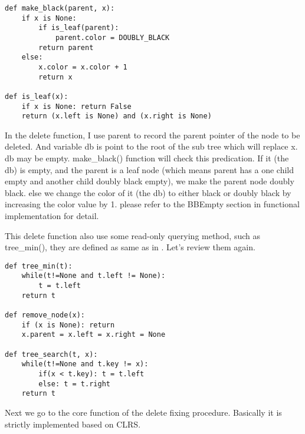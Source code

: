 \documentclass{article}
\begin{document}
\begin{lstlisting}
def make_black(parent, x):
    if x is None:
        if is_leaf(parent):
            parent.color = DOUBLY_BLACK
        return parent
    else:
        x.color = x.color + 1
        return x

def is_leaf(x):
    if x is None: return False
    return (x.left is None) and (x.right is None)
\end{lstlisting}

In the delete function, I use parent to record the parent pointer of the node to be deleted. 
And variable db is point to the root of the sub tree which will replace x. db may be empty.
make\_black() function will check this predication. If it (the db) is empty, and the parent is a leaf
node (which means parent has a one child empty and another child doubly black empty), we make
the parent node doubly black. else we change the color of it (the db) to either black or doubly
black by increasing the color value by 1. please refer to the BBEmpty section in functional 
implementation for detail.

This delete function also use some read-only querying method, such as tree\_min(), they are defined
as same as in \cite{bst-lxy}. Let's review them again.

\begin{lstlisting}
def tree_min(t):
    while(t!=None and t.left != None):
        t = t.left
    return t

def remove_node(x):
    if (x is None): return
    x.parent = x.left = x.right = None

def tree_search(t, x):
    while(t!=None and t.key != x):
        if(x < t.key): t = t.left
        else: t = t.right
    return t
\end{lstlisting}

Next we go to the core function of the delete fixing procedure. Basically it is strictly implemented
based on CLRS.
\end{document}
